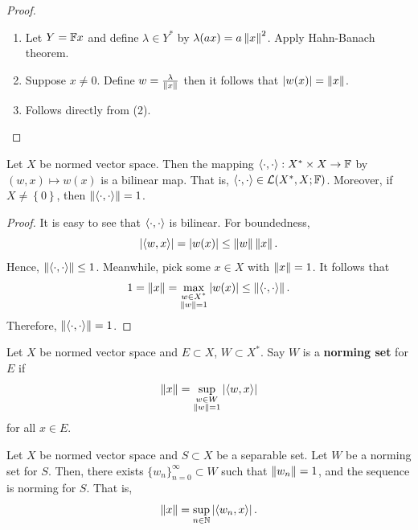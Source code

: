 \documentclass[a4paper]{article}
\renewcommand{\seqinfn}[1]{\{ #1 \}_{n=0}^\infty}
\begin{document}
\begin{proof}

  \begin{enumerate}
    \item Let $Y = \mathbb{F} x$ and define $\lambda \in Y^*$ by $\lambda(a x) = a
          \left\lVert x\right\rVert^2$. Apply Hahn-Banach theorem.

    \item Suppose $x \neq 0$. Define $w = \frac{\lambda}{\left\lVert x\right\rVert}$ then
          it follows that $\left\lvert w(x)\right\rvert = \left\lVert x\right\rVert$.

    \item Follows directly from (2).
  \end{enumerate}

\end{proof}

\begin{prop}
  Let $X$ be normed vector space. Then the mapping $\left\langle \cdot, \cdot \right\rangle
    : X^* \times X \to \mathbb{F}$ by $(w, x) \mapsto w(x)$ is a bilinear map. That
  is, $\left\langle \cdot , \cdot \right\rangle \in \mathcal{L}(X^*, X ; \mathbb{F})$. Moreover, if $X \neq
    \left\{ 0 \right\}$, then $\left\lVert \left\langle \cdot, \cdot \right\rangle\right\rVert = 1$.
\end{prop}

\begin{proof}
  It is easy to see that $\left\langle \cdot, \cdot \right\rangle$ is bilinear. For
  boundedness,
  \[
    \left\lvert \left\langle w, x \right\rangle\right\rvert = \left\lvert w(x)\right\rvert \leq \left\lVert w\right\rVert \left\lVert x\right\rVert.
  \]
  Hence, $\left\lVert \left\langle \cdot, \cdot \right\rangle\right\rVert \leq 1$. Meanwhile, pick some $x
  \in X$ with $\left\lVert x\right\rVert = 1$. It follows that
  \[
    1 = \left\lVert x\right\rVert = \max_{\substack{w \in X^* \\ \left\lVert w\right\rVert = 1}}
    \left\lvert w(x)\right\rvert \leq \left\lVert \left\langle \cdot, \cdot \right\rangle\right\rVert.
  \]
  Therefore, $\left\lVert \left\langle \cdot, \cdot \right\rangle\right\rVert = 1$.
\end{proof}

\begin{defi}
  Let $X$ be normed vector space and $E \subset X$,
  $W \subset X^*$. Say $W$ is a \textbf{norming set}
  for $E$ if
  \[
    \left\lVert x\right\rVert = \sup_{\substack{w \in W \\ \left\lVert w\right\rVert = 1}}
    \left\lvert \left\langle w, x \right\rangle\right\rvert
  \]
  for all $x \in E$.
\end{defi}

\begin{prop}

  Let $X$ be normed vector space and $S \subset X$ be a separable set. Let
  $W$ be a norming set for $S$. Then, there exists $\seqinfn{w_n} \subset
  W$ such that $\left\lVert w_n\right\rVert = 1$, and the sequence is norming for $S$. That
  is,
  \[
    \left\lVert x\right\rVert = \sup_{n \in \mathbb{N}} \left\lvert \left\langle w_n, x \right\rangle\right\rvert.
  \]
\end{prop}
\end{document}
